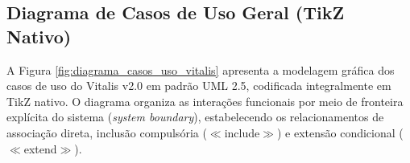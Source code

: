 \subsection{Diagrama de Casos de Uso Geral (TikZ Nativo)}
\label{sec:diagrama_tikz}

A Figura \ref{fig:diagrama_casos_uso_vitalis} apresenta a modelagem gráfica dos casos de uso do Vitalis v2.0 em padrão UML 2.5, codificada integralmente em TikZ nativo. O diagrama organiza as interações funcionais por meio de fronteira explícita do sistema (\textit{system boundary}), estabelecendo os relacionamentos de associação direta, inclusão compulsória ($\ll$include$\gg$) e extensão condicional ($\ll$extend$\gg$).

